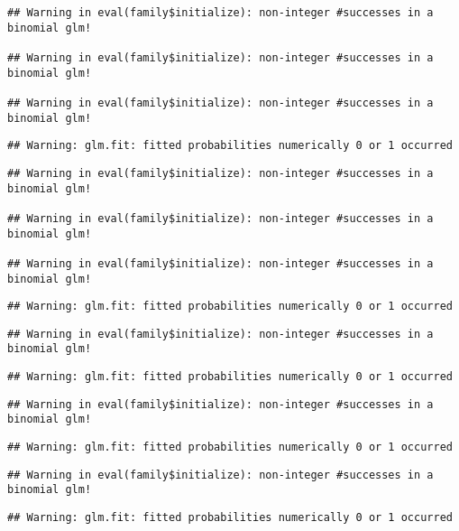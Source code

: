 \documentclass[
]{article}
\begin{document}
\begin{verbatim}
## Warning in eval(family$initialize): non-integer #successes in a binomial glm!

## Warning in eval(family$initialize): non-integer #successes in a binomial glm!

## Warning in eval(family$initialize): non-integer #successes in a binomial glm!
\end{verbatim}

\begin{verbatim}
## Warning: glm.fit: fitted probabilities numerically 0 or 1 occurred
\end{verbatim}

\begin{verbatim}
## Warning in eval(family$initialize): non-integer #successes in a binomial glm!

## Warning in eval(family$initialize): non-integer #successes in a binomial glm!

## Warning in eval(family$initialize): non-integer #successes in a binomial glm!
\end{verbatim}

\begin{verbatim}
## Warning: glm.fit: fitted probabilities numerically 0 or 1 occurred
\end{verbatim}

\begin{verbatim}
## Warning in eval(family$initialize): non-integer #successes in a binomial glm!
\end{verbatim}

\begin{verbatim}
## Warning: glm.fit: fitted probabilities numerically 0 or 1 occurred
\end{verbatim}

\begin{verbatim}
## Warning in eval(family$initialize): non-integer #successes in a binomial glm!
\end{verbatim}

\begin{verbatim}
## Warning: glm.fit: fitted probabilities numerically 0 or 1 occurred
\end{verbatim}

\begin{verbatim}
## Warning in eval(family$initialize): non-integer #successes in a binomial glm!
\end{verbatim}

\begin{verbatim}
## Warning: glm.fit: fitted probabilities numerically 0 or 1 occurred
\end{verbatim}
\end{document}

